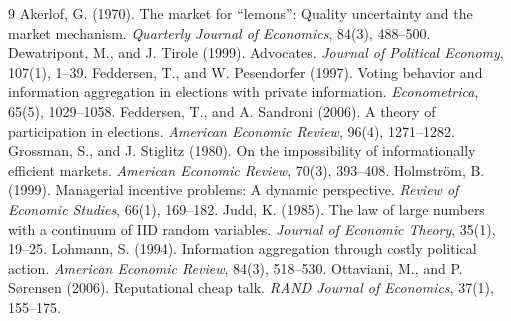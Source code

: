 \documentclass[11pt]{article}
\theoremstyle{remark}
\begin{document}
\begin{thebibliography}{9}
 Akerlof, G. (1970). The market for ``lemons'': Quality
uncertainty and the market mechanism. \emph{Quarterly Journal of Economics},
84(3), 488--500.
 Dewatripont, M., and J. Tirole (1999). Advocates.
\emph{Journal of Political Economy}, 107(1), 1--39.
 Feddersen, T., and W. Pesendorfer (1997). Voting behavior and
information aggregation in elections with private information.
\emph{Econometrica}, 65(5), 1029--1058.
 Feddersen, T., and A. Sandroni (2006). A theory of
participation in elections. \emph{American Economic Review}, 96(4), 1271--1282.
 Grossman, S., and J. Stiglitz (1980). On the impossibility of
informationally efficient markets. \emph{American Economic Review}, 70(3),
393--408.
 Holmstr\"om, B. (1999). Managerial incentive problems:
A dynamic perspective. \emph{Review of Economic Studies}, 66(1), 169--182.
 Judd, K. (1985). The law of large numbers with a continuum
of IID random variables. \emph{Journal of Economic Theory}, 35(1), 19--25.
 Lohmann, S. (1994). Information aggregation through
costly political action. \emph{American Economic Review}, 84(3), 518--530.
 Ottaviani, M., and P. S{\o}rensen (2006). Reputational cheap
talk. \emph{RAND Journal of Economics}, 37(1), 155--175.
\end{thebibliography}
\end{document}
